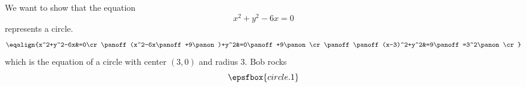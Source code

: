 

We want to show that the equation $$x^2+y^2-6x=0$$ represents a circle.
\panoff $$\eqalign{%
x^2+y^2-6x&=0\cr\panoff
(x^2-6x\panoff+9\panon)+y^2&=0\panoff+9\panon\cr
\panoff\panoff(x-3)^2+y^2&=9\panoff=3^2\panon\cr}$$
\panoff
which is the equation of a circle with center \panoff$(3,0)$\panon{\panoff} and radius
\panoff$3$\panon.
\vfill\eject
{}Bob rocks\panstop\panstop
{}$$\epsfbox{circle.1}$$
\panoff\panoff\panoff\panoff
\bye
